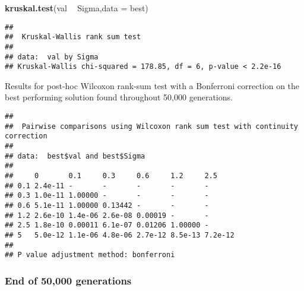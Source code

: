 \documentclass[]{book}
\newenvironment{Shaded}{\begin{snugshade}}{\end{snugshade}}
\newcommand{\DataTypeTok}[1]{\textcolor[rgb]{0.13,0.29,0.53}{#1}}
\newcommand{\KeywordTok}[1]{\textcolor[rgb]{0.13,0.29,0.53}{\textbf{#1}}}
\newcommand{\NormalTok}[1]{#1}
\newcommand{\OperatorTok}[1]{\textcolor[rgb]{0.81,0.36,0.00}{\textbf{#1}}}
\newcommand{\OtherTok}[1]{\textcolor[rgb]{0.56,0.35,0.01}{#1}}
\newcommand{\StringTok}[1]{\textcolor[rgb]{0.31,0.60,0.02}{#1}}
\begin{document}
\begin{Shaded}
\begin{Highlighting}[]
\KeywordTok{kruskal.test}\NormalTok{(val }\OperatorTok{~}\StringTok{ }\NormalTok{Sigma,}\DataTypeTok{data =}\NormalTok{ best)}
\end{Highlighting}
\end{Shaded}

\begin{verbatim}
## 
##  Kruskal-Wallis rank sum test
## 
## data:  val by Sigma
## Kruskal-Wallis chi-squared = 178.85, df = 6, p-value < 2.2e-16
\end{verbatim}

Results for post-hoc Wilcoxon rank-sum test with a Bonferroni correction on the best performing solution found throughout 50,000 generations.

\begin{Shaded}
\end{Shaded}

\begin{verbatim}
## 
##  Pairwise comparisons using Wilcoxon rank sum test with continuity correction 
## 
## data:  best$val and best$Sigma 
## 
##     0       0.1     0.3     0.6     1.2     2.5    
## 0.1 2.4e-11 -       -       -       -       -      
## 0.3 1.0e-11 1.00000 -       -       -       -      
## 0.6 5.1e-11 1.00000 0.13442 -       -       -      
## 1.2 2.6e-10 1.4e-06 2.6e-08 0.00019 -       -      
## 2.5 1.8e-10 0.00011 6.1e-07 0.01206 1.00000 -      
## 5   5.0e-12 1.1e-06 4.8e-06 2.7e-12 8.5e-13 7.2e-12
## 
## P value adjustment method: bonferroni
\end{verbatim}

\hypertarget{end-of-50000-generations-20}{%
\subsubsection{End of 50,000 generations}\label{end-of-50000-generations-20}}
\end{document}
